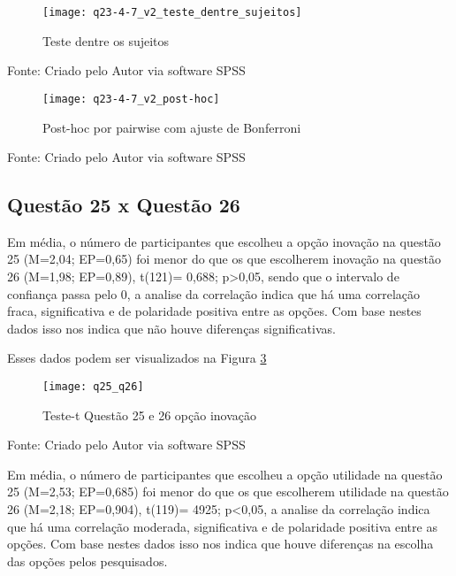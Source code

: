 \begin{figure}[H]
	\centering	
	\caption{Teste dentre os sujeitos}
	\texttt{[image: q23-4-7\_v2\_teste\_dentre\_sujeitos]}
	\label{fig:figura-q23-4-7_v2_teste_dentre_sujeitos}
\end{figure}
\vspace{-0.8 cm} \hspace{1.55 cm} Fonte: Criado pelo Autor via software SPSS

\begin{figure}[H]
	\centering	
	\caption{Post-hoc por pairwise com ajuste de Bonferroni}
	\texttt{[image: q23-4-7\_v2\_post-hoc]}
	\label{fig:figura-q23-4-7_v2_post-hoc}
\end{figure}
\vspace{-0.8 cm} \hspace{1.55 cm} Fonte: Criado pelo Autor via software SPSS\newline

\subsection{Questão 25 x Questão 26}

Em média, o número de participantes que escolheu a opção inovação na questão 25 (M=2,04; EP=0,65) foi menor do que os que escolherem inovação na questão 26 (M=1,98; EP=0,89), t(121)= 0,688; p>0,05, sendo que o intervalo de confiança passa pelo 0, a analise da correlação indica que há uma correlação fraca, significativa e  de polaridade positiva entre as opções. Com base nestes dados isso nos indica que não houve diferenças significativas.

Esses dados podem ser visualizados na Figura \ref{fig:figura-q25_q26}
\begin{figure}[H]
	\centering	
	\caption{Teste-t Questão 25 e 26 opção inovação}
	\texttt{[image: q25\_q26]}
	\label{fig:figura-q25_q26}
\end{figure}
\vspace{-0.8 cm} \hspace{1.55 cm} Fonte: Criado pelo Autor via software SPSS\newline

Em média, o número de participantes que escolheu a opção utilidade na questão 25 (M=2,53; EP=0,685) foi menor do que os que escolherem utilidade na questão 26 (M=2,18; EP=0,904), t(119)= 4925; p<0,05, a analise da correlação indica que há uma correlação moderada, significativa e de polaridade positiva entre as opções. Com base nestes dados isso nos indica que houve diferenças na escolha das opções pelos pesquisados.

